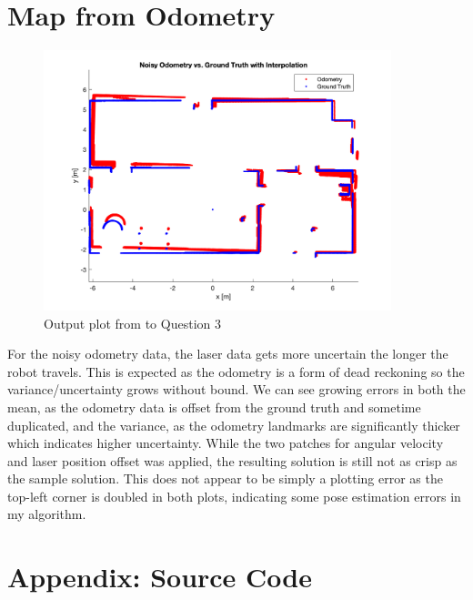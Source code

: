 \documentclass{article} %
\begin{document}
\section{Map from  Odometry} %
\begin{figure}[hbt]
  \centering
    \includegraphics[width=0.9\textwidth]{ass1_q3.png}
  \caption{Output plot from to Question 3}
\end{figure}

For the noisy odometry data, the laser data gets more uncertain the longer the robot travels. This is expected as the odometry is a form of dead reckoning so the variance/uncertainty grows without bound. We can see growing errors in both the mean, as the odometry data is offset from the ground truth and sometime duplicated, and the variance, as the odometry landmarks are significantly thicker which indicates higher uncertainty.
While the two patches for angular velocity and laser position offset was applied, the resulting solution is still not as crisp as the sample solution. This does not appear to be simply a plotting error as the top-left corner is doubled in both plots, indicating some pose estimation errors in my algorithm.


\clearpage
\section*{Appendix: Source Code}

\end{document}
